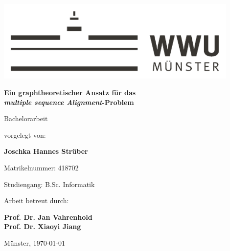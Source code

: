 \begin{centering}
\includegraphics[width=12cm]{./img/wwu-logo-neu.pdf}

\vspace{2cm} 

{\LARGE
	\textbf{Ein graphtheoretischer Ansatz für das \\
		\emph{multiple sequence Alignment}-Problem}\\[1.2cm]
}

{\large
	Bachelorarbeit\\[2cm]
}

{\large
	vorgelegt von:
}

{ \Large
	\textbf{Joschka Hannes Strüber}\\[1cm]
}

{\large
	Matrikelnummer: 418702\\[2mm]
}

{\large
	Studiengang: B.Sc. Informatik\\[1cm]
}
    
                               
{\large
	Arbeit betreut durch:
}

{\Large
	\textbf{Prof. Dr. Jan Vahrenhold \\ Prof. Dr. Xiaoyi Jiang}\\[1cm]
}

{\large
Münster, \today
}
\vfill
\end{centering}